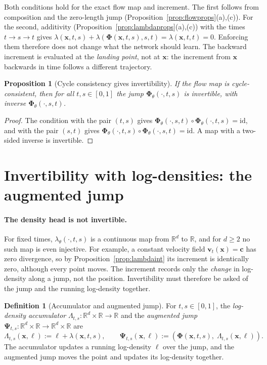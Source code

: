 \documentclass[11pt,a4paper]{article}
\numberwithin{equation}{section}     %
\theoremstyle{plain}        %
\newtheorem{proposition}[theorem]{Proposition}
\theoremstyle{definition}   %
\newtheorem{definition}[theorem]{Definition}
\theoremstyle{remark}       %
\begin{document}
Both conditions hold for the exact flow map and increment. The first follows from composition and the zero-length jump (Proposition~\ref{prop:flowprops}(a),(c)). For the second, additivity (Proposition~\ref{prop:lambdaprops}(a),(c)) with the times $t\to s\to t$ gives $\lambda(\mathbf{x},t,s)+\lambda(\boldsymbol{\Phi}(\mathbf{x},t,s),s,t)=\lambda(\mathbf{x},t,t)=0$. Enforcing them therefore does not change what the network should learn. The backward increment is evaluated at the \emph{landing point}, not at $\mathbf{x}$: the increment from $\mathbf{x}$ backwards in time follows a different trajectory.

\begin{proposition}[Cycle consistency gives invertibility]\label{prop:cycleinv}
If the flow map is cycle-consistent, then for all $t,s\in[0,1]$ the jump $\boldsymbol{\Phi}_\theta(\cdot,t,s)$ is invertible, with inverse $\boldsymbol{\Phi}_\theta(\cdot,s,t)$.
\end{proposition}

\begin{proof}
The condition with the pair $(t,s)$ gives $\boldsymbol{\Phi}_\theta(\cdot,s,t)\circ\boldsymbol{\Phi}_\theta(\cdot,t,s)=\mathrm{id}$, and with the pair $(s,t)$ gives $\boldsymbol{\Phi}_\theta(\cdot,t,s)\circ\boldsymbol{\Phi}_\theta(\cdot,s,t)=\mathrm{id}$. A map with a two-sided inverse is invertible.
\end{proof}

\section{Invertibility with log-densities: the augmented jump}\label{sec:augjump}

\paragraph{The density head is not invertible.} For fixed times, $\lambda_\theta(\cdot,t,s)$ is a continuous map from $\mathbb{R}^d$ to $\mathbb{R}$, and for $d\ge2$ no such map is even injective. For example, a constant velocity field $\mathbf{v}_t(\mathbf{x})=\mathbf{c}$ has zero divergence, so by Proposition~\ref{prop:lambdaint} its increment is identically zero, although every point moves. The increment records only the \emph{change} in log-density along a jump, not the position. Invertibility must therefore be asked of the jump and the running log-density together.

\begin{definition}[Accumulator and augmented jump]\label{def:augjump}
For $t,s\in[0,1]$, the \emph{log-density accumulator} $\Lambda_{t,s}:\mathbb{R}^d\times\mathbb{R}\to\mathbb{R}$ and the \emph{augmented jump} $\boldsymbol{\Psi}_{t,s}:\mathbb{R}^d\times\mathbb{R}\to\mathbb{R}^d\times\mathbb{R}$ are
\[
\Lambda_{t,s}(\mathbf{x},\ell):=\ell+\lambda(\mathbf{x},t,s),\qquad
\boldsymbol{\Psi}_{t,s}(\mathbf{x},\ell):=\left(\boldsymbol{\Phi}(\mathbf{x},t,s),\;\Lambda_{t,s}(\mathbf{x},\ell)\right).
\]
The accumulator updates a running log-density $\ell$ over the jump, and the augmented jump moves the point and updates its log-density together.
\end{definition}
\end{document}
